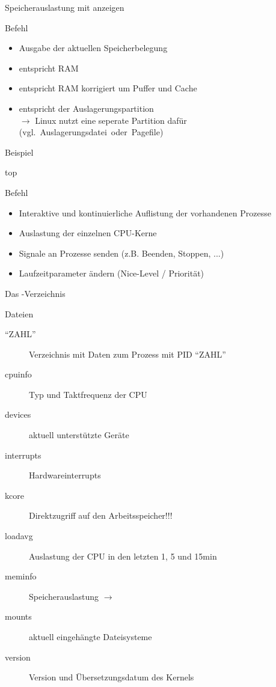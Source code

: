 \documentclass[aspectratio=43]{beamer}
\begin{document}
\begin{frame}{Speicherauslastung mit  anzeigen}
  \begin{block}{Befehl }
    \begin{itemize}
      \item Ausgabe der aktuellen Speicherbelegung
      \item {} entspricht RAM
      \item \co{-/+} entspricht RAM korrigiert um Puffer und Cache
      \item {} entspricht der Auslagerungspartition \\
            $\rightarrow$ Linux nutzt eine seperate Partition dafür
            (vgl.~Auslagerungsdatei~oder~Pagefile)
    \end{itemize}
  \end{block}
  \begin{exampleblock}{Beispiel}
  \end{exampleblock}
\end{frame}

\begin{frame}{top}
  \begin{block}{Befehl }
    \begin{itemize}
      \item Interaktive und kontinuierliche Auflistung der vorhandenen Prozesse
      \item Auslastung der einzelnen CPU-Kerne
      \item Signale an Prozesse senden (z.B. Beenden, Stoppen, ...)
      \item Laufzeitparameter ändern (Nice-Level / Priorität)
    \end{itemize}
  \end{block}
\end{frame}

\begin{frame}{Das -Verzeichnis}
  \begin{block}{Dateien}
    \begin{description}
      \item["`ZAHL"'] Verzeichnis mit Daten zum Prozess mit PID "`ZAHL"'
      \item[cpuinfo] Typ und Taktfrequenz der CPU
      \item[devices] aktuell unterstützte Geräte
      \item[interrupts] Hardwareinterrupts
      \item[kcore]   Direktzugriff auf den Arbeitsspeicher!!!
      \item[loadavg] Auslastung der CPU in den letzten 1, 5 und 15min
      \item[meminfo] Speicherauslastung $\rightarrow$ 
      \item[mounts]  aktuell eingehängte Dateisysteme
      \item[version] Version und Übersetzungsdatum des Kernels
    \end{description}
  \end{block}
\end{frame}
\end{document}

